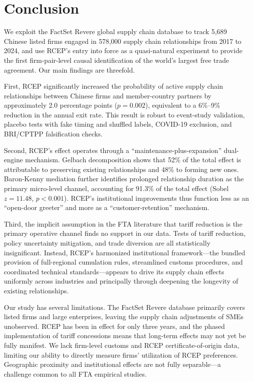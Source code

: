 \documentclass[preprint,12pt,authoryear]{elsarticle}
\begin{document}


\section{Conclusion}
\label{sec:conclusion}

We exploit the FactSet Revere global supply chain database to track 5,689 Chinese listed firms engaged in 578,000 supply chain relationships from 2017 to 2024, and use RCEP's entry into force as a quasi-natural experiment to provide the first firm-pair-level causal identification of the world's largest free trade agreement. Our main findings are threefold.

First, RCEP significantly increased the probability of active supply chain relationships between Chinese firms and member-country partners by approximately 2.0 percentage points ($p=0.002$), equivalent to a 6\%--9\% reduction in the annual exit rate. This result is robust to event-study validation, placebo tests with fake timing and shuffled labels, COVID-19 exclusion, and BRI/CPTPP falsification checks.

Second, RCEP's effect operates through a ``maintenance-plus-expansion'' dual-engine mechanism. Gelbach decomposition shows that 52\% of the total effect is attributable to preserving existing relationships and 48\% to forming new ones. Baron-Kenny mediation further identifies prolonged relationship duration as the primary micro-level channel, accounting for 91.3\% of the total effect (Sobel $z=11.48$, $p<0.001$). RCEP's institutional improvements thus function less as an ``open-door greeter'' and more as a ``customer-retention'' mechanism.

Third, the implicit assumption in the FTA literature that tariff reduction is the primary operative channel finds no support in our data. Tests of tariff reduction, policy uncertainty mitigation, and trade diversion are all statistically insignificant. Instead, RCEP's harmonized institutional framework—the bundled provision of full-regional cumulation rules, streamlined customs procedures, and coordinated technical standards—appears to drive its supply chain effects uniformly across industries and principally through deepening the longevity of existing relationships.

Our study has several limitations. The FactSet Revere database primarily covers listed firms and large enterprises, leaving the supply chain adjustments of SMEs unobserved. RCEP has been in effect for only three years, and the phased implementation of tariff concessions means that long-term effects may not yet be fully manifest. We lack firm-level customs and RCEP certificate-of-origin data, limiting our ability to directly measure firms' utilization of RCEP preferences. Geographic proximity and institutional effects are not fully separable—a challenge common to all FTA empirical studies.
\end{document}
